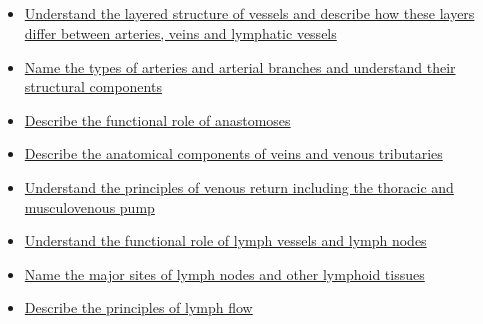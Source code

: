 \documentclass[10pt, a4paper]{article}
\begin{document}
\subsection{} \begin{itemize} \item \href{https://www.notion.so/c10536a34dd14068aad3578128e880b9}{Understand the layered structure of vessels and describe how these layers differ between arteries, veins and lymphatic vessels} \item \href{https://www.notion.so/7e3a2510655c4fce9fc1c2cb0473194d}{Name the types of arteries and arterial branches and understand their structural components} \item \href{https://www.notion.so/8c3588c64a864e53a2c19ddf974442da}{Describe the functional role of anastomoses} \item \href{https://www.notion.so/8072bd996e9847ca82313b0b2b1e8e81}{Describe the anatomical components of veins and venous tributaries} \item \href{https://www.notion.so/034a784cb8864dfbbb32cbe79b2c3c2b}{Understand the principles of venous return including the thoracic and musculovenous pump} \item \href{https://www.notion.so/4448cfb0ac89442389cb8c6942d24635}{Understand the functional role of lymph vessels and lymph nodes} \item \href{https://www.notion.so/d98dd7b8b46c4f1aadd5db68eb02e6e5}{Name the major sites of lymph nodes and other lymphoid tissues} \item \href{https://www.notion.so/6f1d7c8d32964ae0a91a72bde396ba8a}{Describe the principles of lymph flow} \end{itemize}
\end{document}
